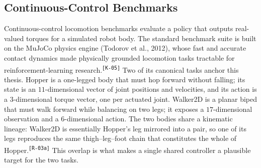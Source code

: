 \documentclass[12pt]{article}
\newcommand{\revID}[1]{\textsuperscript{\scriptsize\texttt{[#1]}}}
\newcommand{\revRepeat}[2]{\textcolor{revTeal}{#2}\revID{#1}}
\newcommand{\revConsistency}[2]{\textcolor{revBlue}{#2}\revID{#1}}
\begin{document}
\subsection{Continuous-Control Benchmarks}
\label{subsec:control-benchmarks}


Continuous-control locomotion benchmarks evaluate a policy that outputs real-valued torques for a simulated robot body.
\revConsistency{K-05}{The standard benchmark suite \cite{brockman_openai_2016, duan_benchmarking_2016} is built on the MuJoCo physics engine (Todorov et al., 2012), whose fast and accurate contact dynamics made physically grounded locomotion tasks tractable for reinforcement-learning research.}
Two of its canonical tasks anchor this thesis.
Hopper is a one-legged body that must hop forward without falling; its state is an $11$-dimensional vector of joint positions and velocities, and its action is a $3$-dimensional torque vector, one per actuated joint.
Walker2D is a planar biped that must walk forward while balancing on two legs; it exposes a $17$-dimensional observation and a $6$-dimensional action.
\revRepeat{R-03a}{The two bodies share a kinematic lineage: Walker2D is essentially Hopper's leg mirrored into a pair, so one of its legs reproduces the same thigh--leg--foot chain that constitutes the whole of Hopper.}
This overlap is what makes a single shared controller a plausible target for the two tasks.
\end{document}
